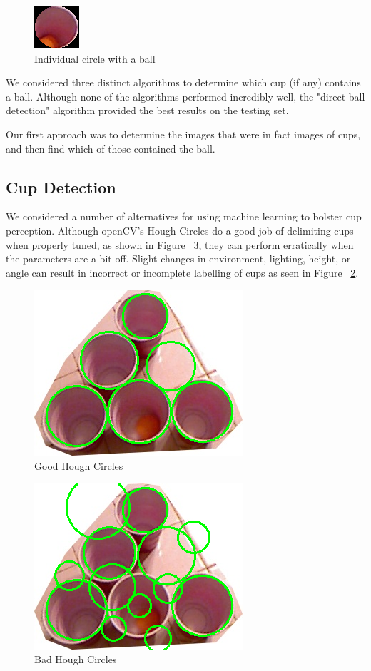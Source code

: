 \documentclass[letterpaper, 10 pt, conference]{ieeeconf}  %
\begin{document}
\begin{figure}[thpb]
      \centering
	  \includegraphics[scale =1]{single1}
      \caption{Individual circle with a ball}
      \label{fig:ball}
\end{figure}

We considered three distinct algorithms to determine which cup (if any) contains a ball.  Although none of the algorithms performed incredibly well, the "direct ball detection" algorithm provided the best results on the testing set.

Our first approach was to determine the images that were in fact images of cups, and then find which of those contained the ball. 

\subsection{Cup Detection}

We considered a number of alternatives for using machine learning to bolster cup perception.  Although openCV’s Hough Circles do a good job of delimiting cups when properly tuned, as shown in Figure ~\ref{fig:bad}, they can perform erratically when the parameters are a bit off.  Slight changes in environment, lighting, height, or angle can result in incorrect or incomplete labelling of cups as seen in Figure ~\ref{fig:good}.

\begin{figure}[thpb]
      \centering
	  \includegraphics[scale =0.5]{good}
      \caption{Good Hough Circles}
      \label{fig:good}
\end{figure}

\begin{figure}[thpb]
      \centering
	  \includegraphics[scale =0.5]{bad}
      \caption{Bad Hough Circles}
      \label{fig:bad}
\end{figure}
\end{document}
